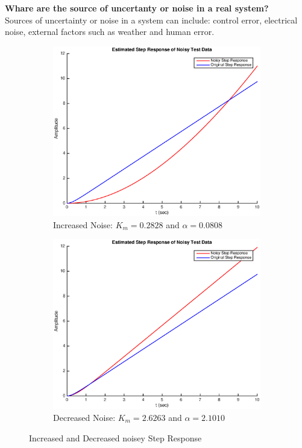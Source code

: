 \documentclass[11pt,a4paper]{article}
\begin{document}
\begin{enumerate}
	\textbf{Whare are the source of uncertanty or noise in a real system?}\\
	Sources of uncertainty or noise in a system can include: control error, electrical noise, external factors such as weather and human error.
	\begin{figure}[H]	
		\begin{subfigure}{0.5\textwidth}
		\includegraphics[width=0.9\linewidth]{PreDec/A7_IncreasedNoise.eps} 
		\caption{Increased Noise: $K_m = 0.2828$ and $\alpha = 0.0808$}
		\label{fig:subim1}
		\end{subfigure}
		\begin{subfigure}{0.5\textwidth}
		\includegraphics[width=0.9\linewidth]{PreDec/A7_DecreasedNoise.eps}
		\caption{Decreased Noise: $K_m = 2.6263$ and $\alpha = 2.1010$}
		\label{fig:subim2}
		\end{subfigure}
  \caption{\label{fig:rand}Increased and Decreased noisey Step Response}
  \end{figure}

\end{enumerate}
\end{document}
